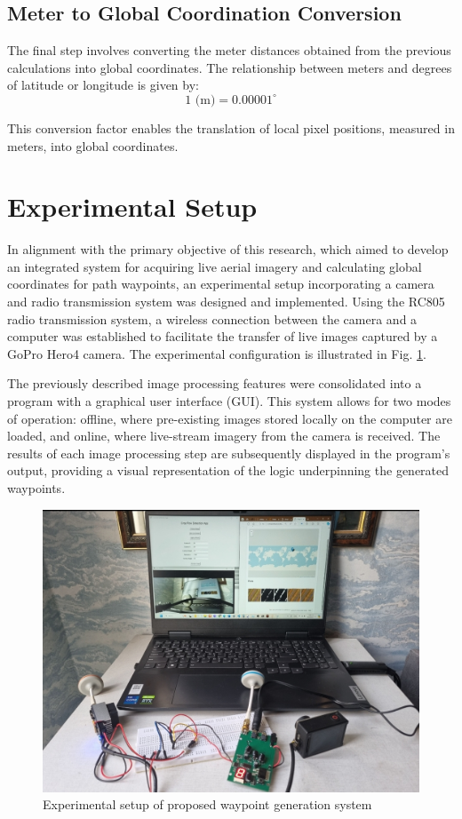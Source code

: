 \documentclass[conference]{IEEEtran}
\begin{document}
\subsection{Meter to Global Coordination Conversion}\label{Meter to Global Coordination Conversion}
The final step involves converting the meter distances obtained from the previous calculations into global coordinates. The relationship between meters and degrees of latitude or longitude is given by:
\[
1 \text{ (m)} = 0.00001^\circ
\]

This conversion factor enables the translation of local pixel positions, measured in meters, into global coordinates.

\section{Experimental Setup}\label{Experimental Setup}
In alignment with the primary objective of this research, which aimed to develop an integrated system for acquiring live aerial imagery and calculating global coordinates for path waypoints, an experimental setup incorporating a camera and radio transmission system was designed and implemented. Using the RC805 radio transmission system, a wireless connection between the camera and a computer was established to facilitate the transfer of live images captured by a GoPro Hero4 camera. The experimental configuration is illustrated in Fig.
\ref{EXP}.

The previously described image processing features were consolidated into a program with a graphical user interface (GUI). This system allows for two modes of operation: offline, where pre-existing images stored locally on the computer are loaded, and online, where live-stream imagery from the camera is received. The results of each image processing step are subsequently displayed in the program's output, providing a visual representation of the logic underpinning the generated waypoints.




\begin{figure}[t]
\includegraphics[width=\linewidth]{Setup of experiment.png}
\caption{Experimental setup of proposed waypoint generation system}
\label{EXP}
\end{figure}
\end{document}
